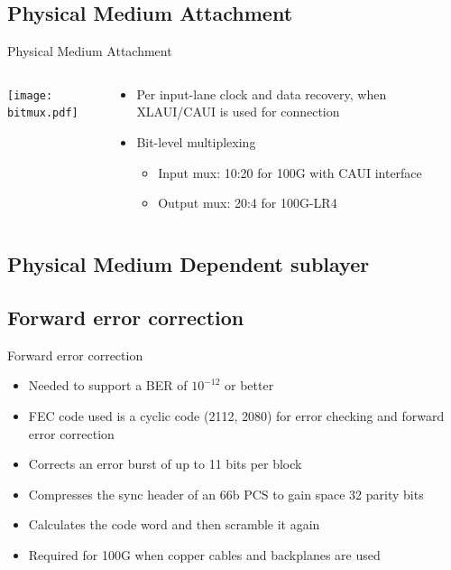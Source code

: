 \documentclass[fleqn,11pt,aspectratio=169]{beamer}
\begin{document}
\subsection{Physical Medium Attachment}
\begin{frame}{Physical Medium Attachment}
\begin{columns} %
\begin{column}{.4\textwidth}
\texttt{[image: bitmux.pdf]}
\end{column}
\begin{column}{.6\textwidth}
\begin{itemize}
\item Per input-lane clock and data recovery, when XLAUI/CAUI is used for connection	
\item Bit-level multiplexing
\begin{itemize}
\item Input mux: 10:20 for 100G with CAUI interface
\item Output mux: 20:4 for 100G-LR4
\end{itemize}
\end{itemize}
\end{column}
\end{columns}
\end{frame}

\subsection{Physical Medium Dependent sublayer}
\subsection{Forward error correction}
\begin{frame}{Forward error correction}
\begin{itemize}
\item  Needed to support a BER  of $10^{-12}$ or better
\item FEC code used is a cyclic code (2112, 2080) for error checking and forward error correction
\item Corrects an error burst of up to 11 bits per block
\item Compresses the sync header of an 66b PCS to gain space 32 parity bits
\item Calculates the code word and then scramble it again
\item Required for 100G when copper cables and backplanes are used
\end{itemize}
\end{frame}
\end{document}
